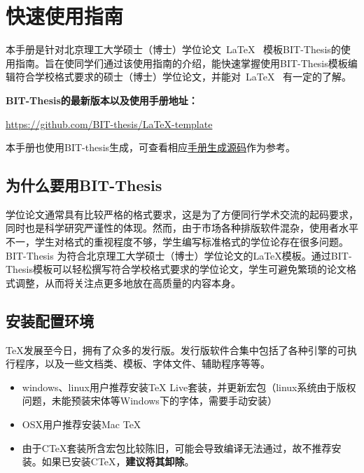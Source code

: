 
\chapter{快速使用指南}
\label{chap:what}

本手册是针对北京理工大学硕士（博士）学位论文~\LaTeX~ 模板BIT-Thesis的使用指南。旨在使同学们通过该使用指南的介绍，能快速掌握使用BIT-Thesis模板编辑符合学校格式要求的硕士（博士）学位论文，并能对~\LaTeX~ 有一定的了解。

\textbf{BIT-Thesis的最新版本以及使用手册地址：}
\begin{center}
\url{https://github.com/BIT-thesis/LaTeX-template}
\end{center}

本手册也使用BIT-thesis生成，可查看相应\href{https://github.com/BIT-thesis/LaTeX-template/tree/master/BIT-thesis-manual}{手册生成源码}作为参考。

\section{为什么要用BIT-Thesis}
\label{sec:why}
学位论文通常具有比较严格的格式要求，这是为了方便同行学术交流的起码要求，同时也是科学研究严谨性的体现。然而，由于市场各种排版软件混杂，使用者水平不一，学生对格式的重视程度不够，学生编写标准格式的学位论存在很多问题。BIT-Thesis 为符合北京理工大学硕士（博士）学位论文的LaTeX模板。通过BIT-Thesis模板可以轻松撰写符合学校格式要求的学位论文，学生可避免繁琐的论文格式调整，从而将关注点更多地放在高质量的内容本身。

\section{安装配置环境}
\label{sec:requirements}

\TeX 发展至今日，拥有了众多的发行版。发行版软件合集中包括了各种引擎的可执行程序，以及一些文档类、模板、字体文件、辅助程序等等。

\begin{itemize}
\item windows、linux用户推荐安装TeX Live套装，并更新宏包（linux系统由于版权问题，未能预装宋体等Windows下的字体，需要手动安装）
\item OSX用户推荐安装Mac TeX
\item 由于CTeX套装所含宏包比较陈旧，可能会导致编译无法通过，故不推荐安装。如果已安装CTeX，\textbf{建议将其卸除}。
\end{itemize}

